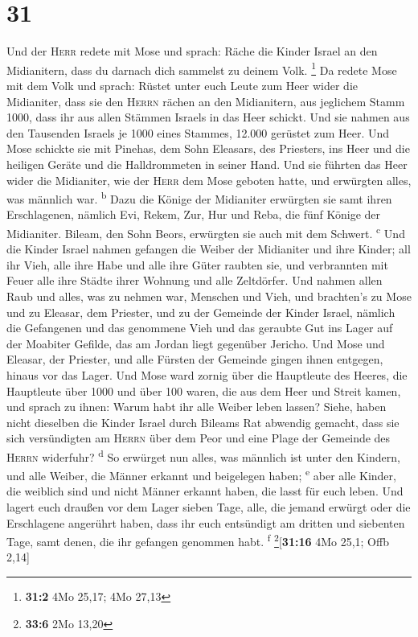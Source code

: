 \hypertarget{section-30}{%
\section{31}\label{section-30}}

 Und der \textsc{Herr} redete mit Mose und sprach:
 Räche die Kinder Israel an den Midianitern, dass du
darnach dich sammelst zu deinem Volk. \footnote{\textbf{31:2} 4Mo 25,17;
  4Mo 27,13}  Da redete Mose mit dem Volk und sprach:
Rüstet unter euch Leute zum Heer wider die Midianiter, dass sie den
\textsc{Herrn} rächen an den Midianitern,  aus jeglichem
Stamm 1000, dass ihr aus allen Stämmen Israels in das Heer schickt.
 Und sie nahmen aus den Tausenden Israels je 1000 eines
Stammes, 12.000 gerüstet zum Heer.  Und Mose schickte sie
mit Pinehas, dem Sohn Eleasars, des Priesters, ins Heer und die heiligen
Geräte und die Halldrommeten in seiner Hand.  Und sie
führten das Heer wider die Midianiter, wie der \textsc{Herr} dem Mose
geboten hatte, und erwürgten alles, was männlich war.
\textsuperscript{b}  Dazu die Könige der Midianiter
erwürgten sie samt ihren Erschlagenen, nämlich Evi, Rekem, Zur, Hur und
Reba, die fünf Könige der Midianiter. Bileam, den Sohn Beors, erwürgten
sie auch mit dem Schwert. \textsuperscript{c}  Und die
Kinder Israel nahmen gefangen die Weiber der Midianiter und ihre Kinder;
all ihr Vieh, alle ihre Habe und alle ihre Güter raubten sie,
 und verbrannten mit Feuer alle ihre Städte ihrer Wohnung
und alle Zeltdörfer.  Und nahmen allen Raub und alles,
was zu nehmen war, Menschen und Vieh,  und brachten's zu
Mose und zu Eleasar, dem Priester, und zu der Gemeinde der Kinder
Israel, nämlich die Gefangenen und das genommene Vieh und das geraubte
Gut ins Lager auf der Moabiter Gefilde, das am Jordan liegt gegenüber
Jericho.  Und Mose und Eleasar, der Priester, und alle
Fürsten der Gemeinde gingen ihnen entgegen, hinaus vor das Lager.
 Und Mose ward zornig über die Hauptleute des Heeres, die
Hauptleute über 1000 und über 100 waren, die aus dem Heer und Streit
kamen,  und sprach zu ihnen: Warum habt ihr alle Weiber
leben lassen?  Siehe, haben nicht dieselben die Kinder
Israel durch Bileams Rat abwendig gemacht, dass sie sich versündigten am
\textsc{Herrn} über dem Peor und eine Plage der Gemeinde des
\textsc{Herrn} widerfuhr? \textsuperscript{d}  So
erwürget nun alles, was männlich ist unter den Kindern, und alle Weiber,
die Männer erkannt und beigelegen haben; \textsuperscript{e}
 aber alle Kinder, die weiblich sind und nicht Männer
erkannt haben, die lasst für euch leben.  Und lagert euch
draußen vor dem Lager sieben Tage, alle, die jemand erwürgt oder die
Erschlagene angerührt haben, dass ihr euch entsündigt am dritten und
siebenten Tage, samt denen, die ihr gefangen genommen habt.
\textsuperscript{f} \footnote{\textbf{33:6} 2Mo 13,20}{[}\textbf{31:16}
4Mo 25,1; Offb 2,14{]}

